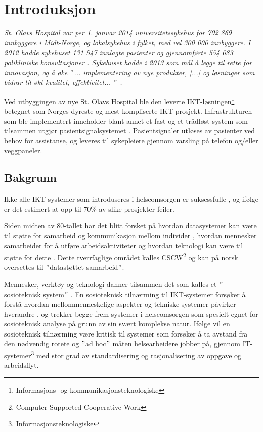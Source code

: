\chapter{Introduksjon}
\label{chp:introduksjon}
\textit{St. Olavs Hospital var per 1. januar 2014 universitetssykehus for 702 869 innbyggere i Midt-Norge, og lokalsykehus i fylket, med vel 300 000 innbyggere. I 2012 hadde sykehuset 131 547 innlagte pasienter og gjennomførte 554 083 polikliniske konsultasjoner \citep{stolavs}. Sykehuset hadde i 2013 som mål å legge til rette for innovasjon, og å øke $"$... implementering av nye produkter, [...] og løsninger som bidrar til økt kvalitet, effektivitet... $"$ \citep{styring13}.}

\noindent
Ved utbyggingen av nye St. Olavs Hospital ble den leverte IKT-løsningen\footnote{Informasjons- og kommunikasjonsteknologiske} betegnet som Norges dyreste og mest kompliserte IKT-prosjekt. Infrastrukturen som ble implementert inneholder blant annet et fast og et trådløst system som tilsammen utgjør pasientsignalsystemet \citep{TU}. Pasientsignaler utløses av pasienter ved behov for assistanse, og leveres til sykepleiere gjennom varsling på telefon og/eller veggpaneler.

\section{Bakgrunn}
Ikke alle IKT-systemer som introduseres i helseomsorgen er suksessfulle \citep{Coiera07}, og ifølge \citet{FITT} er det estimert at opp til 70\% av slike prosjekter feiler.

\noindent
Siden midten av 80-tallet har det blitt forsket på hvordan datasystemer kan være til støtte for samarbeid og kommunikasjon mellom individer \citep{Rogers94}, hvordan mennesker samarbeider for å utføre arbeidsaktiviteter og hvordan teknologi kan være til støtte for dette \citep{Ellis91}. Dette tverrfaglige området kalles CSCW\footnote{Computer-Supported Cooperative Work} og kan på norsk oversettes til $"$datastøttet samarbeid$"$. 

\noindent
Mennesker, verktøy og teknologi danner tilsammen det som kalles et $"$sosioteknisk system$"$ \citep{Coiera04}. En sosioteknisk tilnærming til IKT-systemer forsøker å forstå hvordan mellommenneskelige aspekter og tekniske systemer påvirker hverandre \citep{Coiera04}. \citet{Coiera07} og \citet{Berg99} trekker begge frem systemer i helseomsorgen som spesielt egnet for sosioteknisk analyse på grunn av sin svært komplekse natur. Ifølge \citet{Berg99} vil en sosioteknisk tilnærming være kritisk til systemer som forsøker å ta avstand fra den nødvendig rotete og $"$ad hoc$"$ måten helsearbeidere jobber på, gjennom IT-systemer\footnote{Informasjonsteknologiske} med stor grad av standardisering og rasjonalisering av oppgave og arbeidsflyt.

